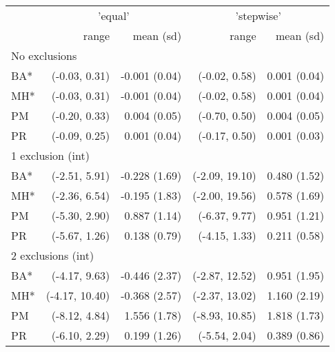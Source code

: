 \begin{table}[t]
\centering\small
\begin{tabular}{lrrrr}
\toprule
 & \multicolumn{2}{c}{'equal'} & \multicolumn{2}{c}{'stepwise'} \\ 
\cmidrule(lr){2-3} \cmidrule(lr){4-5}
 & range & mean (sd) & range & mean (sd) \\ 
\midrule
\multicolumn{5}{l}{No exclusions} \\ 
\midrule
\hspace{11.25pt} BA* & (-0.03, 0.31) & -0.001 (0.04) & (-0.02, 0.58) & 0.001 (0.04) \\ 
\hspace{11.25pt} MH* & (-0.03, 0.31) & -0.001 (0.04) & (-0.02, 0.58) & 0.001 (0.04) \\ 
\hspace{11.25pt} PM & (-0.20, 0.33) & 0.004 (0.05) & (-0.70, 0.50) & 0.004 (0.05) \\ 
\hspace{11.25pt} PR & (-0.09, 0.25) & 0.001 (0.04) & (-0.17, 0.50) & 0.001 (0.03) \\ 
\midrule
\multicolumn{5}{l}{1 exclusion (int)} \\ 
\midrule
\hspace{11.25pt} BA* & (-2.51, 5.91) & -0.228 (1.69) & (-2.09, 19.10) & 0.480 (1.52) \\ 
\hspace{11.25pt} MH* & (-2.36, 6.54) & -0.195 (1.83) & (-2.00, 19.56) & 0.578 (1.69) \\ 
\hspace{11.25pt} PM & (-5.30, 2.90) & 0.887 (1.14) & (-6.37, 9.77) & 0.951 (1.21) \\ 
\hspace{11.25pt} PR & (-5.67, 1.26) & 0.138 (0.79) & (-4.15, 1.33) & 0.211 (0.58) \\ 
\midrule
\multicolumn{5}{l}{2 exclusions (int)} \\ 
\midrule
\hspace{11.25pt} BA* & (-4.17, 9.63) & -0.446 (2.37) & (-2.87, 12.52) & 0.951 (1.95) \\ 
\hspace{11.25pt} MH* & (-4.17, 10.40) & -0.368 (2.57) & (-2.37, 13.02) & 1.160 (2.19) \\ 
\hspace{11.25pt} PM & (-8.12, 4.84) & 1.556 (1.78) & (-8.93, 10.85) & 1.818 (1.73) \\ 
\hspace{11.25pt} PR & (-6.10, 2.29) & 0.199 (1.26) & (-5.54, 2.04) & 0.389 (0.86) \\ 

\end{tabular}
\end{table}
